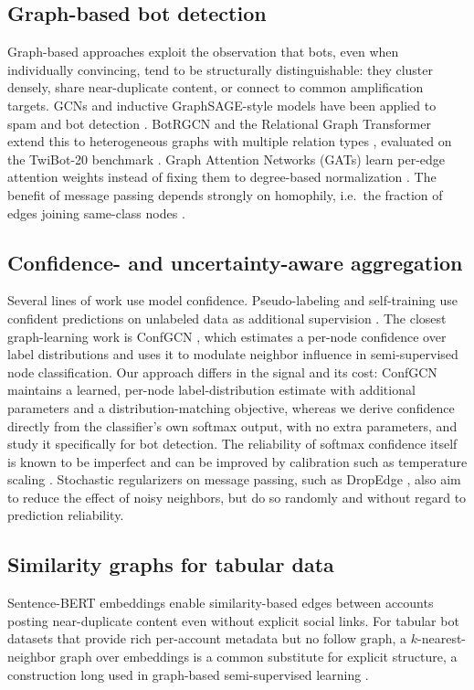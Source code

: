 \documentclass[conference]{IEEEtran}
\begin{document}
\subsection{Graph-based bot detection}
Graph-based approaches exploit the observation that bots, even when individually convincing, tend to be structurally distinguishable: they cluster densely, share near-duplicate content, or connect to common amplification targets. GCNs \cite{kipf2017gcn} and inductive GraphSAGE-style models \cite{hamilton2017sage} have been applied to spam and bot detection \cite{alhosseini2019detect}. BotRGCN and the Relational Graph Transformer extend this to heterogeneous graphs with multiple relation types \cite{feng2021botrgcn,feng2022rgt}, evaluated on the TwiBot-20 benchmark \cite{feng2021twibot20}. Graph Attention Networks (GATs) learn per-edge attention weights instead of fixing them to degree-based normalization \cite{velickovic2018gat}. The benefit of message passing depends strongly on homophily, i.e.\ the fraction of edges joining same-class nodes \cite{zhu2020beyond}.

\subsection{Confidence- and uncertainty-aware aggregation}
Several lines of work use model confidence. Pseudo-labeling and self-training use confident predictions on unlabeled data as additional supervision \cite{lee2013pseudo}. The closest graph-learning work is ConfGCN \cite{vashishth2019confgcn}, which estimates a per-node confidence over label distributions and uses it to modulate neighbor influence in semi-supervised node classification. Our approach differs in the signal and its cost: ConfGCN maintains a learned, per-node label-distribution estimate with additional parameters and a distribution-matching objective, whereas we derive confidence directly from the classifier's own softmax output, with no extra parameters, and study it specifically for bot detection. The reliability of softmax confidence itself is known to be imperfect and can be improved by calibration such as temperature scaling \cite{guo2017calibration}. Stochastic regularizers on message passing, such as DropEdge \cite{rong2020dropedge}, also aim to reduce the effect of noisy neighbors, but do so randomly and without regard to prediction reliability.

\subsection{Similarity graphs for tabular data}
Sentence-BERT embeddings \cite{reimers2019sbert} enable similarity-based edges between accounts posting near-duplicate content even without explicit social links. For tabular bot datasets that provide rich per-account metadata but no follow graph, a $k$-nearest-neighbor graph over embeddings is a common substitute for explicit structure, a construction long used in graph-based semi-supervised learning \cite{zhu2003semi}.
\end{document}
